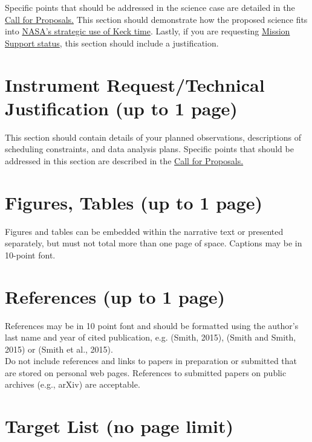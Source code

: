 \documentclass[12pt]{article}
\begin{document}
\noindent
Specific points that should be addressed in the science case are detailed in the
\href{http://nexsci.caltech.edu/missions/KeckSolicitation/gen-info.shtml#Ibi}{Call for Proposals.} 
This section should demonstrate how the proposed science fits into 
\href{http://nexsci.caltech.edu/missions/KeckSolicitation/gen-info.shtml#Ia}{NASA’s strategic use of Keck time}.
Lastly, if you are requesting 
\href{http://nexsci.caltech.edu/missions/KeckSolicitation/gen-info.shtml#IIb}{Mission Support status},
this section should include a justification.

\section{Instrument Request/Technical Justification (up to 1 page)}

\noindent
This section should contain details of your planned observations, descriptions of scheduling constraints, and 
data analysis plans.  Specific points that should be addressed in this section are described in the 
\href{http://nexsci.caltech.edu/missions/KeckSolicitation/gen-info.shtml#Ibi}{Call for Proposals.} 

\section{Figures, Tables (up to 1 page)}

\noindent
Figures and tables can be embedded within the narrative text or presented separately, but must not total 
more than one page of space.  Captions may be in 10-point font.

\section{References (up to 1 page)}

\noindent
References may be in 10 point font and should be formatted using the author's last name and year of cited publication, 
e.g. (Smith, 2015), (Smith and Smith, 2015) or (Smith et al., 2015).  \\

\noindent
Do not include references and links to papers in preparation or submitted that are stored on personal web pages. References to submitted papers on public archives (e.g., arXiv) are acceptable.

\section{Target List (no page limit)}
\end{document}
